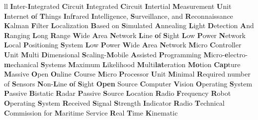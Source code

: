\begin{abbreviations}{ll}
    		{\textbf{I}nter-\textbf{I}ntegrated \textbf{C}ircuit}
    			{\textbf{I}ntegrated  \textbf{C}ircuit}
    		{\textbf{I}ntertial \textbf{M}easurement \textbf{U}nit}
    		{\textbf{I}nternet \textbf{o}f \textbf{T}hings}
    		    {\textbf{I}nf\textbf{r}ared}
    		{\textbf{I}ntelligence, \textbf{S}urveillance, and \textbf{R}econnaissance}
    			{\textbf{K}alman \textbf{F}ilter}
    		{\textbf{L}ocalization \textbf{B}ased on \textbf{S}imulated \textbf{A}nnealing}
    		{\textbf{L}ight \textbf{D}etection \textbf{A}nd \textbf{R}anging}
    	{\textbf{L}ong \textbf{R}ange \textbf{W}ide \textbf{A}rea \textbf{N}etwork}
    		{\textbf{L}ine   \textbf{o}f \textbf{S}ight}
    		{\textbf{L}ow \textbf{P}ower \textbf{N}etwork}
    		{\textbf{L}ocal \textbf{P}ositioning \textbf{S}ystem}
    		{\textbf{L}ow \textbf{P}ower \textbf{W}ide \textbf{A}rea \textbf{N}etwork}
    		{\textbf{M}icro \textbf{C}ontroller \textbf{U}nit}
    	{\textbf{M}ulti \textbf{D}imensional \textbf{S}caling-\textbf{M}obile \textbf{A}ssisted \textbf{P}rogramming}
    		{\textbf{M}icro-\textbf{e}lectro-\textbf{m}echanical \textbf{S}ystems}
    			{\textbf{M}aximum \textbf{L}ikelihood}
    		{\textbf{M}ulti\textbf{lat}eration}
    		{\textbf{Mo}tion \textbf{Cap}ture}
    		{\textbf{M}assive \textbf{O}pen \textbf{O}nline \textbf{C}ourse}
    		{\textbf{M}icro \textbf{P}rocessor \textbf{U}nit}
    		{\textbf{M}inimal \textbf{R}equired number of \textbf{S}ensors}
    		{\textbf{N}on-\textbf{L}ine \textbf{o}f \textbf{S}ight}
    		{\textbf{Open} Source \textbf{C}omputer \textbf{V}ision}
    			{\textbf{O}perating \textbf{S}ystem}
    		{\textbf{P}assive \textbf{B}istatic \textbf{R}adar}
    		{\textbf{P}assive \textbf{S}ource \textbf{L}ocation}
    	   		{\textbf{R}adio \textbf{F}requency}
    		{\textbf{R}obot \textbf{O}perating \textbf{S}ystem}
    		{\textbf{R}eceived \textbf{S}ignal \textbf{S}trength \textbf{I}ndicator}
    		{\textbf{R}adio \textbf{T}echnical \textbf{C}ommission for \textbf{M}aritime Service}
    		{\textbf{R}eal \textbf{T}ime \textbf{K}inematic}

\end{abbreviations}
